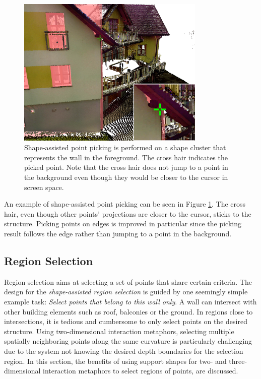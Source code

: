 \begin{figure}
    \centering
    \includegraphics[width=0.8\textwidth]{System_Design/picking_assisted_screenshot.png}%
    \caption[Screenshot of Shape-assisted Point Picking]
    {Shape-assisted point picking is performed on a shape cluster that represents the wall in the foreground. The cross hair indicates the picked point. Note that the cross hair does not jump to a point in the background even though they would be closer to the cursor in screen space. }
    \label{fig:picking_assisted_screenshot}
\end{figure}

An example of shape-assisted point picking can be seen in Figure \ref{fig:picking_assisted_screenshot}. The cross hair, even though other points' projections are closer to the cursor, sticks to the structure. Picking points on edges is improved in particular since the picking result follows the edge rather than jumping to a point in the background. 


\subsection{Region Selection}
\label{sec:regionSelection}

Region selection aims at selecting a set of points that share certain criteria.
The design for the \textit{shape-assisted region selection} is guided by one seemingly simple example task: \textit{Select points that belong to this wall only}. A wall can intersect with other building elements such as roof, balconies or the ground. In regions close to intersections, it is tedious and cumbersome to only select points on the desired structure. Using two-dimensional interaction metaphors, selecting multiple spatially neighboring points along the same curvature is particularly challenging due to the system not knowing the desired depth boundaries for the selection region. In this section, the benefits of using support shapes for two- and three-dimensional interaction metaphors to select regions of points,  are discussed. 


